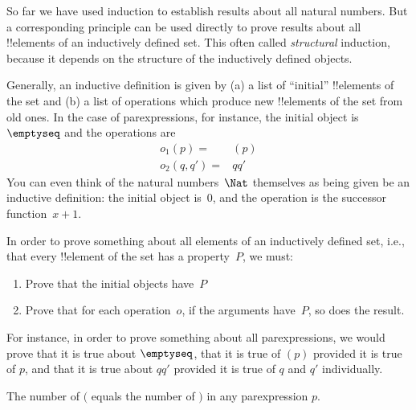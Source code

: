 \documentclass[../../../include/open-logic-section]{subfiles}
\begin{document}


So far we have used induction to establish results about all natural
numbers. But a corresponding principle can be used directly to prove
results about all !!{element}s of an inductively defined set.  This
often called \emph{structural} induction, because it depends on the
structure of the inductively defined objects.

Generally, an inductive definition is given by (a) a list of
``initial'' !!{element}s of the set and (b) a list of operations which
produce new !!{element}s of the set from old ones. In the case of
parexpressions, for instance, the initial object is~$\emptyseq$ and
the operations are
\begin{align*}
  o_1(p) = & (p) \\
  o_2(q, q') = & qq'
\end{align*}
You can even think of the natural numbers~$\Nat$ themselves as being
given be an inductive definition: the initial object is~$0$, and the
operation is the successor function~$x + 1$.

In order to prove something about all elements of an inductively
defined set, i.e., that every !!{element} of the set has a
property~$P$, we must:
\begin{enumerate}
\item Prove that the initial objects have~$P$
\item Prove that for each operation~$o$, if the arguments have~$P$,
  so does the result.
\end{enumerate}
For instance, in order to prove something about all parexpressions, we
would prove that it is true about $\emptyseq$, that it is true of
$(p)$ provided it is true of $p$, and that it is true about $qq'$
provided it is true of $q$ and $q'$ individually.

\begin{prop}
  The number of $($ equals the number of $)$ in any parexpression $p$.
\end{prop}
\end{document}
